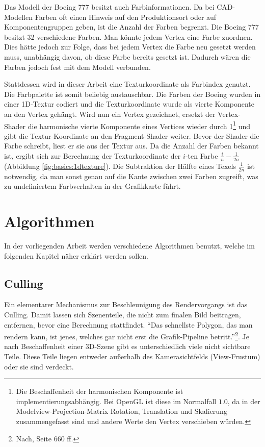 Das Modell der Boeing 777 besitzt auch Farbinformationen. Da bei CAD-Modellen Farben oft einen Hinweis auf den Produktionsort oder auf Komponentengruppen geben, ist die Anzahl der Farben begrenzt. Die Boeing 777 besitzt 32 verschiedene Farben. Man könnte jedem Vertex eine Farbe zuordnen. Dies hätte jedoch zur Folge, dass bei jedem Vertex die Farbe neu gesetzt werden muss, unabhängig davon, ob diese Farbe bereits gesetzt ist. Dadurch wären die Farben jedoch fest mit dem Modell verbunden. 

Stattdessen wird in dieser Arbeit eine Texturkoordinate als Farbindex genutzt. Die Farbpalette ist somit beliebig austauschbar. Die Farben der Boeing wurden in einer 1D-Textur codiert und die Texturkoordinate wurde als vierte Komponente an den Vertex gehängt. Wird nun ein Vertex gezeichnet, ersetzt der Vertex-Shader die harmonische vierte Komponente eines Vertices wieder durch 1\footnote{Die Beschaffenheit der harmonischen Komponente ist implementierungsabhängig. Bei OpenGL ist diese im Normalfall $1.0$, da in der Modelview-Projection-Matrix Rotation, Translation und Skalierung zusammengefasst sind und andere Werte den Vertex verschieben würden.} und gibt die Textur-Koordinate an den Fragment-Shader weiter. Bevor der Shader die Farbe schreibt, liest er sie aus der Textur aus. Da die Anzahl der Farben bekannt ist, ergibt sich zur Berechnung der Texturkoordinate der $i$-ten Farbe $\frac{i}{n}-\frac{1}{2n}$ (Abbildung \ref{fig:basics:1dtexture}). Die Subtraktion der Hälfte eines Texels $\frac{1}{2n}$ ist notwendig, da man sonst genau auf die Kante zwischen zwei Farben zugreift, was zu undefiniertem Farbverhalten in der Grafikkarte führt.

\section{Algorithmen}
\label{sec:basics:algos}
In der vorliegenden Arbeit werden verschiedene Algorithmen benutzt, welche im folgenden Kapitel näher erklärt werden sollen.

\subsection{Culling}
\label{sec:basics:algos:culling}
Ein elementarer Mechanismus zur Beschleunigung des Rendervorgangs ist das Culling. Damit lassen sich Szenenteile, die nicht zum finalen Bild beitragen, entfernen, bevor eine Berechnung stattfindet. "`Das schnellste Polygon, das man rendern kann, ist jenes, welches gar nicht erst die Grafik-Pipeline betritt."'\footnote{Nach, Seite 660 ff.}. Je nach Beschaffenheit einer 3D-Szene gibt es unterschiedlich viele nicht sichtbare Teile. Diese Teile liegen entweder außerhalb des Kamerasichtfelds (View-Frustum) oder sie sind verdeckt. 

